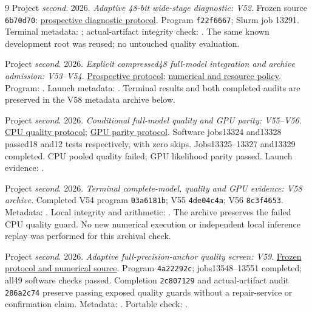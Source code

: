 \documentclass[10pt,twocolumn,letterpaper]{article}
\begin{document}
\begin{thebibliography}{9}
Project \emph{second}. 2026. \emph{Adaptive 48-bit wide-stage diagnostic: V52}.
Frozen source \texttt{6b70d70}:
\href{https://github.com/priyankjairaj100/second/blob/6b70d703a716cef744f49ba1c55add3a691c3267/research_v52/PROTOCOL.txt}{prospective diagnostic protocol}.
Program \texttt{f22f6667}; Slurm job 13291.
Terminal metadata: ;
actual-artifact integrity check: .
The same known development root was reused; no untouched quality evaluation.

Project \emph{second}. 2026. \emph{Explicit compressed48 full-model integration and archive admission: V53--V54}.
\href{https://github.com/priyankjairaj100/second/blob/9826a95/research_v54/PROTOCOL.txt}{Prospective protocol};
\href{https://github.com/priyankjairaj100/second/blob/7f3b10d/research_v53/PROTOCOL.txt}{numerical and resource policy}.
Program: .
Launch metadata: .
Terminal results and both completed audits are preserved in the V58 metadata archive below.


Project \emph{second}. 2026. \emph{Conditional full-model quality and GPU parity: V55--V56}.
\href{https://github.com/priyankjairaj100/second/blob/792400b/research_v55/PROTOCOL.txt}{CPU quality protocol};
\href{https://github.com/priyankjairaj100/second/blob/5dcd24c/research_v56/PROTOCOL.txt}{GPU parity protocol}.
Software jobs13324 and13328 passed18 and12 tests respectively, with zero skips.
Jobs13325--13327 and13329 completed. CPU pooled quality failed; GPU likelihood parity passed.
Launch evidence: .


Project \emph{second}. 2026. \emph{Terminal complete-model, quality and GPU evidence: V58 archive}.
Completed V54 program \texttt{03a6181b}; V55 \texttt{4de04c4a}; V56 \texttt{8c3f4653}.
Metadata: .
Local integrity and arithmetic: .
The archive preserves the failed CPU quality guard. No new numerical execution
or independent local inference replay was performed for this archival check.

Project \emph{second}. 2026. \emph{Adaptive full-precision-anchor quality screen: V59}.
\href{https://github.com/priyankjairaj100/second/blob/60a514098511526924cb5746a2a61851b5f6bd23/research_v59/PROTOCOL.txt}{Frozen protocol and numerical source}.
Program \texttt{4a22292c}; jobs13548--13551 completed; all49 software checks passed.
Completion \texttt{2c807129} and actual-artifact audit \texttt{286a2c74} preserve
passing exposed quality guards without a repair-service or confirmation claim.
Metadata: .
Portable check: .


\end{thebibliography}
\end{document}

